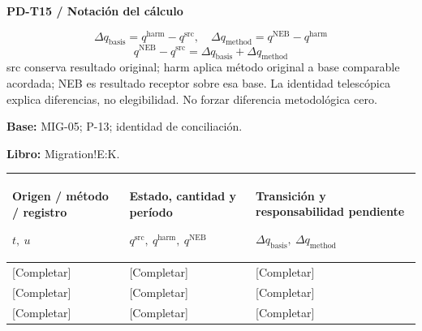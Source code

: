 \par\begingroup\sffamily\fontsize{8}{10}\selectfont\color{NEBGreen}\setlength{\parskip}{2pt}\setlength{\abovedisplayskip}{4pt}\setlength{\belowdisplayskip}{4pt}\setlength{\abovedisplayshortskip}{2pt}\setlength{\belowdisplayshortskip}{3pt}
\textbf{PD-T15 / Notación del cálculo}\par
{\fontsize{9}{11}\selectfont\[ \Delta q_{\mathrm{basis}}=q^{\mathrm{harm}}-q^{\mathrm{src}},\quad \Delta q_{\mathrm{method}}=q^{\mathrm{NEB}}-q^{\mathrm{harm}} \]}
{\fontsize{9}{11}\selectfont\[ q^{\mathrm{NEB}}-q^{\mathrm{src}}=\Delta q_{\mathrm{basis}}+\Delta q_{\mathrm{method}} \]}
src conserva resultado original; harm aplica método original a base comparable acordada; NEB es resultado receptor sobre esa base. La identidad telescópica explica diferencias, no elegibilidad. No forzar diferencia metodológica cero.\par
\textbf{Base:} MIG-05; P-13; identidad de conciliación.\par
\textbf{Libro:} Migration!E:K.\par\endgroup
{\sffamily\fontsize{8.3}{10.3}\selectfont\begin{longtable}{@{}P{52.79mm} P{51.14mm} P{61.14mm}@{}}
\toprule
\textbf{Origen / método / registro}\par {\normalfont\fontsize{8.2}{10}\selectfont $t,\ u$} & \textbf{Estado, cantidad y período}\par {\normalfont\fontsize{8.2}{10}\selectfont $q^{\mathrm{src}},\ q^{\mathrm{harm}},\ q^{\mathrm{NEB}}$} & \textbf{Transición y responsabilidad pendiente}\par {\normalfont\fontsize{8.2}{10}\selectfont $\Delta q_{\mathrm{basis}},\ \Delta q_{\mathrm{method}}$}\\\midrule\endhead
\rule{0pt}{7.7mm}[Completar] & [Completar] & [Completar]\\\hline
\rule{0pt}{7.7mm}[Completar] & [Completar] & [Completar]\\\hline
\rule{0pt}{7.7mm}[Completar] & [Completar] & [Completar]\\\hline
\end{longtable}}
